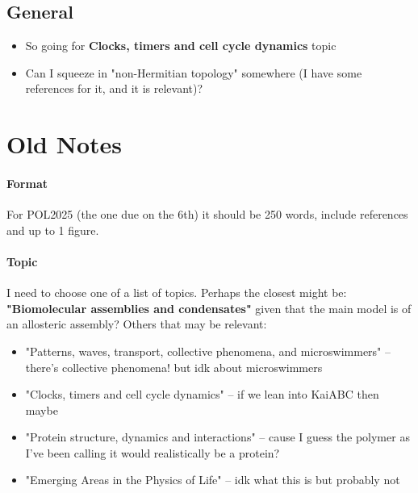 \documentclass[11pt]{article}
\begin{document}
\subsection{General}
\begin{itemize}
	\item So going for \textbf{Clocks, timers and cell cycle dynamics} topic
	\item Can I squeeze in "non-Hermitian topology" somewhere (I have some references for it, and it is relevant)?
\end{itemize}

\newpage
\section{Old Notes}
\paragraph{Format}
For POL2025 (the one due on the 6th) it should be 250 words, include references and up to 1 figure.
\paragraph{Topic}
I need to choose one of a list of topics.
Perhaps the closest might be: \textbf{"Biomolecular assemblies and condensates"} given that the main model is of an allosteric assembly?
Others that may be relevant:
\begin{itemize}
	\item "Patterns, waves, transport, collective phenomena, and microswimmers" -- there's collective phenomena! but idk about microswimmers
	\item "Clocks, timers and cell cycle dynamics" -- if we lean into KaiABC then maybe
	\item "Protein structure, dynamics and interactions" -- cause I guess the polymer as I've been calling it would realistically be a protein?
	\item "Emerging Areas in the Physics of Life" -- idk what this is but probably not
\end{itemize}
\end{document}
